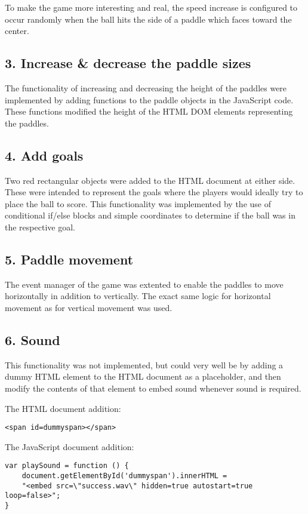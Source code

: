 \documentclass[a4paper,10pt]{article}
\begin{document}
To make the game more interesting and real, the speed increase is configured to occur randomly when the ball hits the side of a paddle which faces toward the center.

\subsection{3. Increase \& decrease the paddle sizes}
The functionality of increasing and decreasing the height of the paddles were implemented by adding functions to the paddle objects in the JavaScript code. These functions modified the height of the HTML DOM elements representing the paddles.

\subsection{4. Add goals}
Two red rectangular objects were added to the HTML document at either side. These were intended to represent the goals where the players would ideally try to place the ball to score. This functionality was implemented by the use of conditional if/else blocks and simple coordinates to determine if the ball was in the respective goal.

\subsection{5. Paddle movement}
The event manager of the game was extented to enable the paddles to move horizontally in addition to vertically. The exact same logic for horizontal movement as for vertical movement was used.

\subsection{6. Sound}
This functionality was not implemented, but could very well be by adding a dummy HTML element to the HTML document as a placeholder, and then modify the contents of that element to embed sound whenever sound is required.

The HTML document addition:
\begin{verbatim}
<span id=dummyspan></span>
\end{verbatim}

The JavaScript document addition:
\begin{verbatim}
var playSound = function () {
    document.getElementById('dummyspan').innerHTML = 
    "<embed src=\"success.wav\" hidden=true autostart=true loop=false>";
}
\end{verbatim}
\end{document}
